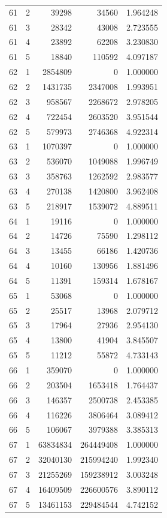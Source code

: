 \begin{longtable}{rrrrr}
61 & 2 & 39298 & 34560 & 1.964248 \\
61 & 3 & 28342 & 43008 & 2.723555 \\
61 & 4 & 23892 & 62208 & 3.230830 \\
61 & 5 & 18840 & 110592 & 4.097187 \\
62 & 1 & 2854809 & 0 & 1.000000 \\
62 & 2 & 1431735 & 2347008 & 1.993951 \\
62 & 3 & 958567 & 2268672 & 2.978205 \\
62 & 4 & 722454 & 2603520 & 3.951544 \\
62 & 5 & 579973 & 2746368 & 4.922314 \\
63 & 1 & 1070397 & 0 & 1.000000 \\
63 & 2 & 536070 & 1049088 & 1.996749 \\
63 & 3 & 358763 & 1262592 & 2.983577 \\
63 & 4 & 270138 & 1420800 & 3.962408 \\
63 & 5 & 218917 & 1539072 & 4.889511 \\
64 & 1 & 19116 & 0 & 1.000000 \\
64 & 2 & 14726 & 75590 & 1.298112 \\
64 & 3 & 13455 & 66186 & 1.420736 \\
64 & 4 & 10160 & 130956 & 1.881496 \\
64 & 5 & 11391 & 159314 & 1.678167 \\
65 & 1 & 53068 & 0 & 1.000000 \\
65 & 2 & 25517 & 13968 & 2.079712 \\
65 & 3 & 17964 & 27936 & 2.954130 \\
65 & 4 & 13800 & 41904 & 3.845507 \\
65 & 5 & 11212 & 55872 & 4.733143 \\
66 & 1 & 359070 & 0 & 1.000000 \\
66 & 2 & 203504 & 1653418 & 1.764437 \\
66 & 3 & 146357 & 2500738 & 2.453385 \\
66 & 4 & 116226 & 3806464 & 3.089412 \\
66 & 5 & 106067 & 3979388 & 3.385313 \\
67 & 1 & 63834834 & 264449408 & 1.000000 \\
67 & 2 & 32040130 & 215994240 & 1.992340 \\
67 & 3 & 21255269 & 159238912 & 3.003248 \\
67 & 4 & 16409509 & 226600576 & 3.890112 \\
67 & 5 & 13461153 & 229484544 & 4.742152 \\

\end{longtable}
